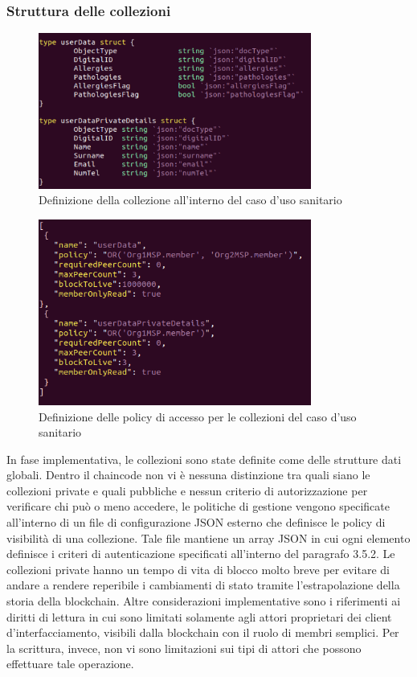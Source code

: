 \subsubsection{Struttura delle collezioni}
\begin{figure}[h]
    \centering
    \includegraphics[width=0.8\textwidth]{img/collection-chaincode.png}
    \caption{Definizione della collezione all'interno del caso d'uso sanitario}
    \label{fig:collection-chaincode}
\end{figure}
\begin{figure}[h]
    \centering
    \includegraphics[width=0.8\textwidth]{img/policy-collection-json.png}
    \caption{Definizione delle policy di accesso per le collezioni del caso d'uso sanitario}
    \label{fig:policy-collection}
\end{figure}
In fase implementativa, le collezioni sono state definite come delle strutture dati globali.
Dentro il chaincode non vi è nessuna distinzione tra quali siano le collezioni private e quali pubbliche e nessun criterio di autorizzazione per verificare chi può o meno accedere, le politiche di gestione vengono specificate all'interno di un file di configurazione JSON esterno che definisce le policy di visibilità di una collezione. Tale file mantiene un array JSON in cui ogni elemento definisce i criteri di autenticazione specificati all'interno del paragrafo 3.5.2. Le collezioni private hanno un tempo di vita di blocco molto breve per evitare di andare a rendere reperibile i cambiamenti di stato tramite l'estrapolazione della storia della blockchain. Altre considerazioni implementative sono i riferimenti ai diritti di lettura in cui sono limitati solamente agli attori proprietari dei client d'interfacciamento, visibili dalla blockchain con il ruolo di membri semplici. Per la scrittura, invece, non vi sono limitazioni sui tipi di attori che possono effettuare tale operazione.

